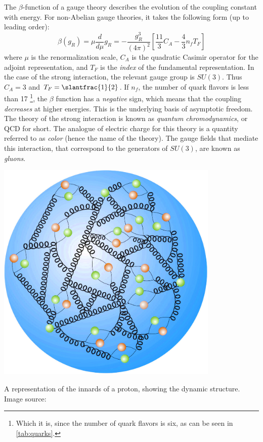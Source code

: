 The $\beta$-function of a gauge theory describes the evolution of the coupling constant with energy. For non-Abelian gauge theories, it takes the following form (up to leading order):
\begin{equation}
  \beta(g_R) = \mu\frac{d}{d\mu}g_R = -\frac{g_R^3}{(4\pi)^2}\left[\frac{11}{3}C_A -\frac{4}{3}n_fT_F\right]
\end{equation}
where $\mu$ is the renormalization scale, $C_A$ is the quadratic Casimir operator for the adjoint representation, and $T_F$ is the \emph{index} of the fundamental representation.
In the case of the strong interaction, the relevant gauge group is $SU(3)$. Thus $C_A = 3$ and $T_F = \slantfrac{1}{2}$. If $n_f$, the number of quark flavors is less than 17 \footnote{Which it is, since the number of quark flavors is six, as can be seen in \autoref{tab:quarks}.}, the $\beta$ function has a \emph{negative} sign, which means that the coupling \emph{decreases} at higher energies. This is the underlying basis of asymptotic freedom. The theory of the strong interaction is known as \emph{quantum chromodynamics}, or QCD for short. The analogue of electric charge for this theory is a quantity referred to as \emph{color} (hence the name of the theory). The gauge fields that mediate this interaction, that correspond to the generators of $SU(3)$, are known as \emph{gluons}. 
\begin{marginfigure}[-15cm]
  \includegraphics[width=0.8\textwidth]{images/proton_innards}
\caption{A representation of the innards of a proton, showing the dynamic structure. Image source:\citep{proton_structure}}
\end{marginfigure}

